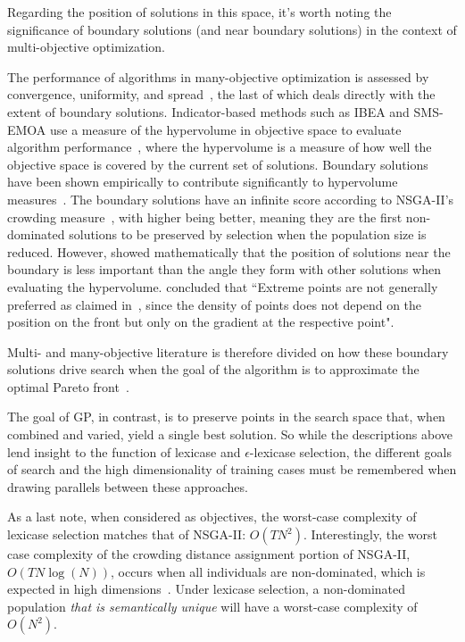 \documentclass[twoside]{article}
\newcommand{\edit}[1]{{\color{red} #1}}
\begin{document}
Regarding the position of solutions in this space, it's worth noting the significance of boundary solutions (and near boundary solutions) in the context of multi-objective optimization. \edit{The performance of algorithms in many-objective optimization is assessed by convergence, uniformity, and spread~\citep{li_spread_2009}, the last of which deals directly with the extent of boundary solutions. Indicator-based methods such as IBEA and SMS-EMOA use a measure of the hypervolume in objective space to evaluate algorithm performance~\citep{wagner_pareto-_2007}, where the hypervolume is a measure of how well the objective space is covered by the current set of solutions. Boundary solutions have been shown empirically to contribute significantly to hypervolume measures~\citep{deb_evaluating_2005}. The boundary solutions have an infinite score according to NSGA-II's crowding measure~\citep{schoenauer_fast_2000}, with higher being better, meaning they are the first non-dominated solutions to be preserved by selection when the population size is reduced. However, \cite{auger_theory_2009} showed mathematically that the position of solutions near the boundary is less important than the angle they form with other solutions when evaluating the hypervolume. \cite{auger_theory_2009} concluded that ``Extreme points are not generally preferred as claimed in~\citep{deb_evaluating_2005}, since the density of points does not depend on the position on the front but only on the gradient at the respective point".

Multi- and many-objective literature is therefore divided on how these boundary solutions drive search when the goal of the algorithm is to approximate the optimal Pareto front~\citep{wagner_pareto-_2007}.} The goal of GP, in contrast, is to preserve points in the search space that, when combined and varied, yield a single best solution. So while the descriptions above lend insight to the function of lexicase and $\epsilon$-lexicase selection, the different goals of search and the high dimensionality of training cases must be remembered when \edit{drawing parallels between these approaches.} 

As a last note, when considered as objectives, the worst-case complexity of lexicase selection matches that of NSGA-II: $O(TN^2)$. Interestingly, the worst case complexity of the crowding distance assignment portion of NSGA-II, $O(TN\log(N))$, occurs when all individuals are non-dominated, which is expected in high dimensions~\citep{farina_optimal_2002, wagner_pareto-_2007}. Under lexicase selection, a non-dominated population {\it that is semantically unique} will have a worst-case complexity of $O(N^2)$. 
\end{document}
